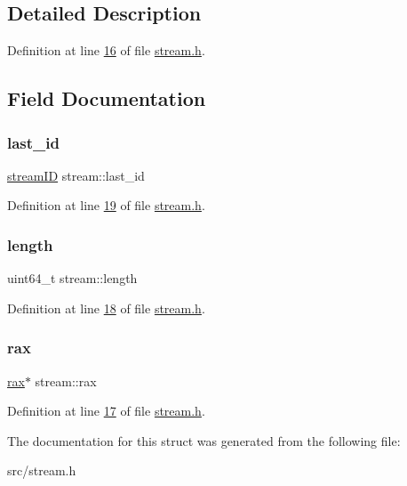 \subsection{Detailed Description}


Definition at line \hyperlink{stream_8h_source_l00016}{16} of file \hyperlink{stream_8h_source}{stream.\+h}.



\subsection{Field Documentation}
\mbox{\label{structstream_adc5d2c6bce4a80d96ff17b80fcd180fb}} 
\subsubsection{\texorpdfstring{last\+\_\+id}{last\_id}}
{\footnotesize\ttfamily \hyperlink{structstreamID}{stream\+ID} stream\+::last\+\_\+id}



Definition at line \hyperlink{stream_8h_source_l00019}{19} of file \hyperlink{stream_8h_source}{stream.\+h}.

\mbox{\label{structstream_ace249bebbe9bb1afb985d6a6ff5b3e1a}} 
\subsubsection{\texorpdfstring{length}{length}}
{\footnotesize\ttfamily uint64\+\_\+t stream\+::length}



Definition at line \hyperlink{stream_8h_source_l00018}{18} of file \hyperlink{stream_8h_source}{stream.\+h}.

\mbox{\label{structstream_aaf9d3feea819c3fedf264ec02da0202e}} 
\subsubsection{\texorpdfstring{rax}{rax}}
{\footnotesize\ttfamily \hyperlink{structrax}{rax}$\ast$ stream\+::rax}



Definition at line \hyperlink{stream_8h_source_l00017}{17} of file \hyperlink{stream_8h_source}{stream.\+h}.



The documentation for this struct was generated from the following file\+:\begin{DoxyCompactItemize}
\item 
src/stream.\+h\end{DoxyCompactItemize}
